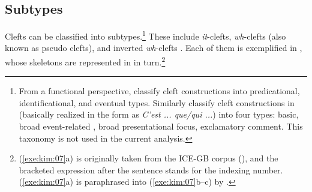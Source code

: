 

\subsection{Subtypes}
\label{10:sssec:clefts:subtypes}


Clefts can be classified into subtypes.\footnote{From a
  functional perspective, \citet{kim:yang:09} classify cleft
  constructions into predicational, identificational, and eventual
  types.  Similarly \citet{clech:99} classify cleft constructions in
   (basically realized in the form as \textit{C'est ... que/qui
    ...})  into four types: basic, broad event-related , broad
  presentational focus, exclamatory comment. This taxonomy is not used
  in the current analysis.}  These include \textit{it}-clefts,
\textit{wh}-clefts (also known as pseudo clefts), and inverted
\textit{wh}-clefts \citep{kim:07}.  Each of them is exemplified in
, whose skeletons are represented in
 in turn.\footnote{(\ref{exe:kim:07}a) is
  originally taken from the ICE-GB corpus (\citealt{nelson:etal:02}),
  and the bracketed expression after the sentence stands for the
  indexing number. (\ref{exe:kim:07}a) is paraphrased into
  (\ref{exe:kim:07}b--c) by \citet{kim:07}.}




